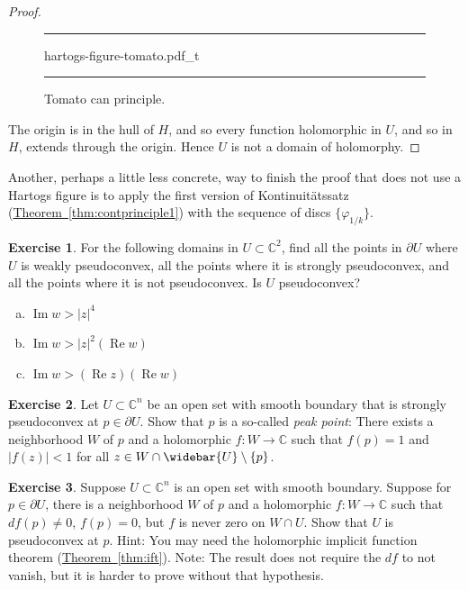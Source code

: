 \documentclass[12pt,openany]{book}
\renewcommand{\Re}{\operatorname{Re}}
\renewcommand{\Im}{\operatorname{Im}}
\newcommand{\sabs}[1]{\lvert {#1} \rvert}
\newcommand{\C}{{\mathbb{C}}}
\newcommand{\myindex}[1]{#1\index{#1}}
\theoremstyle{plain}
\theoremstyle{remark}
\theoremstyle{definition}
\newenvironment{exbox}{%
    \def\FrameCommand{\vrule width 1pt \relax\hspace{10pt}}%
    \MakeFramed{\advance\hsize-\width\FrameRestore}%
}{%
    \endMakeFramed
}
\newenvironment{exparts}{%
    \leavevmode\begin{enumerate}[a),noitemsep,topsep=0pt,parsep=0pt,partopsep=0pt]
}{%
    \end{enumerate}
}
\newenvironment{myfig}{%
\begin{figure}[h!t]
\noindent\rule{\textwidth}{0.5pt}\vspace{12pt}\par\centering}%
{\par\noindent\rule{\textwidth}{0.5pt}
\end{figure}}
\theoremstyle{exercise}
\newtheorem{exercise}{Exercise}[section]
\theoremstyle{example}
\newcommand{\thmref}[1]{\hyperref[#1]{Theorem~\ref*{#1}}}
\begin{document}
\begin{proof}
\begin{myfig}
{hartogs-figure-tomato.pdf_t}
\caption{Tomato can principle.\label{fig:hartogs-figure-tomato}}
\end{myfig}

The origin is in the hull of $H$, and so
every function holomorphic in $U$, and so in $H$, extends through the origin.
Hence $U$ is not a domain of holomorphy.
\end{proof}

Another, perhaps a little less concrete, way to finish the proof that does not use a Hartogs figure
is to apply the first version of Kontinuit\"atssatz
(\thmref{thm:contprinciple1}) with the sequence of discs $\{ \varphi_{1/k} \}$.

\begin{exbox}
\begin{exercise}
\pagebreak[2]
For the following domains in $U \subset \C^2$,
find all the
points in $\partial U$ where $U$ is weakly pseudoconvex, all the points
where it is strongly pseudoconvex, and all the points where it is
not pseudoconvex.  Is $U$ pseudoconvex?
\begin{exparts}
\item
$\Im w > \sabs{z}^4$
\item
$\Im w > \sabs{z}^2(\Re w)$
\item
$\Im w > (\Re z)(\Re w)$
\end{exparts}
\end{exercise}

\begin{exercise}
\pagebreak[2]
Let $U \subset \C^n$ be an open set with smooth boundary that is
strongly pseudoconvex at $p \in \partial U$.  Show that
$p$ is a so-called \emph{\myindex{peak point}}: There
exists a neighborhood $W$ of $p$ and a holomorphic
$f \colon W \to \C$ such that $f(p)=1$ and $\sabs{f(z)} < 1$ for all
$z \in W \cap \widebar{U} \setminus \{ p \}$.
\end{exercise}

\begin{exercise}
Suppose $U \subset \C^n$ is an open set with smooth boundary.  Suppose
for $p \in \partial U$, there is a neighborhood $W$ of $p$
and a holomorphic $f \colon W \to
\C$ such that $df(p) \neq 0$, $f(p) = 0$, but
$f$ is never zero on $W \cap U$.  Show that $U$ is pseudoconvex
at $p$.  Hint: You may need the holomorphic implicit function theorem
(\thmref{thm:ift}).
Note: The result does not require the $df$ to not vanish, but it is
harder to prove without that hypothesis.
\end{exercise}
\end{exbox}
\end{document}
